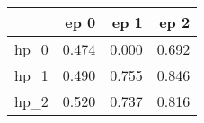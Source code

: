 \begin{tabular}{lrrr}
\toprule
{} &   ep 0 &   ep 1 &   ep 2 \\
\midrule
hp\_0 &  0.474 &  0.000 &  0.692 \\
hp\_1 &  0.490 &  0.755 &  0.846 \\
hp\_2 &  0.520 &  0.737 &  0.816 \\
\bottomrule
\end{tabular}
